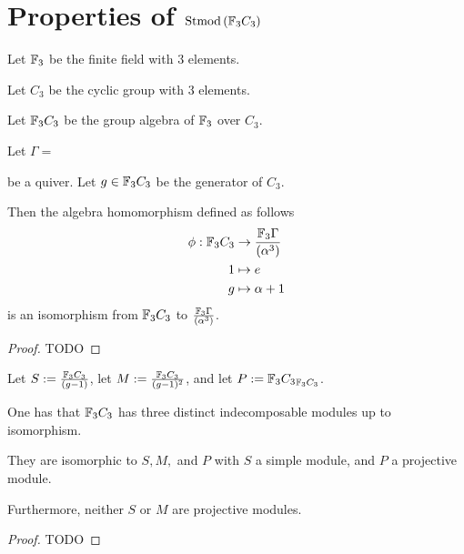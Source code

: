 \section{Properties of \texorpdfstring{\( \operatorname{Stmod}\left(  {\mathbb{F}}_3 C_3  \right) \)}{Stmod(F\_3C\_3)}} 

\begin{notation}
    Let \( {\mathbb{F}}_3 \) be the finite field with \( 3 \) elements.
\end{notation}

\begin{notation}
    Let \( C_3 \) be the cyclic group with \( 3 \) elements.
\end{notation}

\begin{notation}
    Let \( {\mathbb{F}}_3 C_3 \) be the group algebra of \( {\mathbb{F}}_3 \) over \( C_3 \).
\end{notation}

\begin{lemma}
    Let \( \Gamma = \)
    be a quiver.
    Let \( g \in {\mathbb{F}}_3 C_3 \) be the generator of \( C_3 \).
    
    Then the algebra homomorphism defined as follows
    \begin{align*}
        \phi: {\mathbb{F}}_3 C_3 &\to \frac{{\mathbb{F}}_3\Gamma}{(\alpha^3)} \\
        1 &\mapsto e \\
        g &\mapsto \alpha + 1
    \end{align*}
    is an isomorphism from \( {\mathbb{F}}_3 C_3 \) to \( \frac{{\mathbb{F}}_3\Gamma}{(\alpha^3)} \).    
\end{lemma}
\begin{proof}
    TODO
\end{proof}

\begin{definition}
    Let \( S := \frac{{\mathbb{F}}_3C_3}{(g - 1)} \), let \( M := \frac{{\mathbb{F}}_3C_3}{(g - 1)^2} \), and let \( P := {{\mathbb{F}}_3C_3}_{{\mathbb{F}}_3C_3} \).
\end{definition}

\begin{lemma}
    One has that \( {\mathbb{F}}_3 C_3 \) has three distinct indecomposable modules up to isomorphism.
    
    They are isomorphic to \( S, M, \) and \( P \) with \( S \) a simple module, and \( P \) a projective module.

    Furthermore, neither \( S \) or \( M \) are projective modules.
\end{lemma}
\begin{proof}
    TODO
\end{proof}


